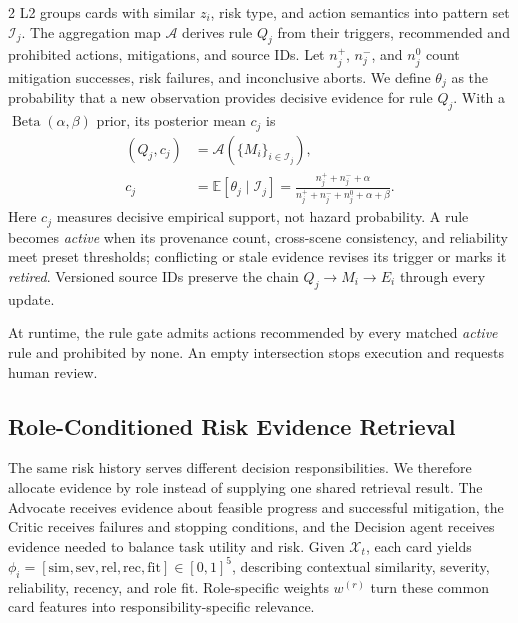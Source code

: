 \documentclass[10pt]{article}
\begin{document}
\begin{multicols}{2}
L2 groups cards with similar $z_i$, risk type, and action semantics into pattern set $\mathcal{I}_j$. The aggregation map $\mathcal{A}$ derives rule $Q_j$ from their triggers, recommended and prohibited actions, mitigations, and source IDs. Let $n_j^+$, $n_j^-$, and $n_j^0$ count mitigation successes, risk failures, and inconclusive aborts. We define $\theta_j$ as the probability that a new observation provides decisive evidence for rule $Q_j$. With a $\operatorname{Beta}(\alpha,\beta)$ prior, its posterior mean $c_j$ is
\begin{equation}
\begin{aligned}
(Q_j,c_j)&=\mathcal{A}(\{M_i\}_{i\in\mathcal{I}_j}),\\
c_j&=\mathbb{E}[\theta_j\mid\mathcal{I}_j]
=\frac{n_j^++n_j^-+\alpha}
{n_j^++n_j^-+n_j^0+\alpha+\beta}.
\end{aligned}
\label{eq:rule-en}
\end{equation}
Here $c_j$ measures decisive empirical support, not hazard probability. A rule becomes \textit{active} when its provenance count, cross-scene consistency, and reliability meet preset thresholds; conflicting or stale evidence revises its trigger or marks it \textit{retired}. Versioned source IDs preserve the chain $Q_j\rightarrow M_i\rightarrow E_i$ through every update.

At runtime, the rule gate admits actions recommended by every matched \textit{active} rule and prohibited by none. An empty intersection stops execution and requests human review.

\subsection{Role-Conditioned Risk Evidence Retrieval}

The same risk history serves different decision responsibilities. We therefore allocate evidence by role instead of supplying one shared retrieval result. The Advocate receives evidence about feasible progress and successful mitigation, the Critic receives failures and stopping conditions, and the Decision agent receives evidence needed to balance task utility and risk. Given $\mathcal{X}_t$, each card yields $\phi_i=[\mathrm{sim},\mathrm{sev},\mathrm{rel},\mathrm{rec},\mathrm{fit}]\in[0,1]^5$, describing contextual similarity, severity, reliability, recency, and role fit. Role-specific weights $w^{(r)}$ turn these common card features into responsibility-specific relevance.


\end{multicols}
\end{document}
